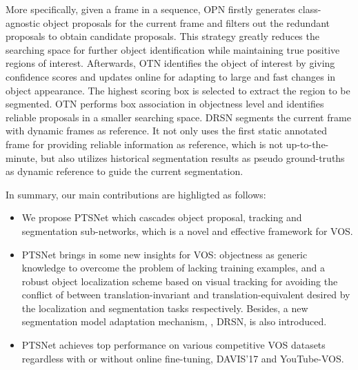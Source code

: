 \documentclass[10pt,twocolumn,letterpaper]{article}
\begin{document}
More specifically, given a frame in a sequence, OPN firstly generates class-agnostic object proposals for the current frame and filters out the redundant proposals to obtain candidate proposals. This strategy greatly reduces the searching space for further object identification while maintaining true positive regions of interest. Afterwards, OTN identifies the object of interest by giving confidence scores and updates online for adapting to large and fast changes in object appearance. The highest scoring box is selected to extract the region to be segmented. OTN performs box association in objectness level and identifies reliable proposals in a smaller searching space. DRSN segments the current frame with dynamic frames as reference. It not only uses the first static annotated frame for providing reliable information as reference, which is not up-to-the-minute, but also utilizes historical segmentation results as pseudo ground-truths as dynamic reference to guide the current segmentation.

In summary, our main contributions are highligted as follows:
\begin{itemize}
    \item We propose PTSNet which cascades object proposal, tracking and segmentation sub-networks, which is a novel and effective framework for VOS. 
    \item PTSNet brings in some new insights for VOS: objectness as generic knowledge to overcome the problem of lacking training examples, and a robust object localization scheme based on visual tracking for avoiding the conflict of between translation-invariant and translation-equivalent desired by the localization and segmentation tasks respectively. Besides, a new segmentation model adaptation mechanism, \ie, DRSN, is also introduced.
\item PTSNet achieves top performance on various competitive VOS datasets regardless with or without online fine-tuning, \eg DAVIS'17 and YouTube-VOS.
\end{itemize}
\end{document}
